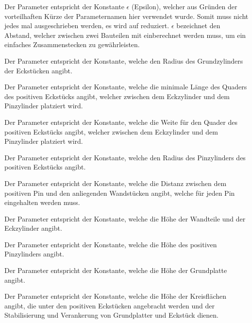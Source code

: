 \begin{description}[style=nextline]
	\item[E ($\epsilon$/Epsilon)] 
		Der Parameter  entspricht der Konstante $\epsilon$ (Epsilon), welcher aus Gründen der vorteilhaften Kürze der Parameternamen hier verwendet wurde.
		Somit muss nicht jedes mal  ausgeschrieben werden, es wird auf  reduziert.
		$\epsilon$ bezeichnet den Abstand, welcher zwischen zwei Bauteilen mit einberechnet werden muss, um ein einfaches Zusammenstecken zu gewährleisten.
	\item[CornerRadius]
		Der Parameter  entspricht der Konstante, welche den Radius des Grundzylinders der Eckstücken angibt.
	\item[PinMinLength] 
		Der Parameter  entspricht der Konstante, welche die minimale Länge des Quaders des positiven Eckstücks angibt, welcher zwischen dem Eckzylinder und dem Pinzylinder platziert wird.
	\item[PinPWidth] 
		Der Parameter  entspricht der Konstante, welche die Weite für den Quader des positiven Eckstücks angibt, welcher zwischen dem Eckzylinder und dem Pinzylinder platziert wird.
	\item[PinPRadius] 
		Der Parameter  entspricht der Konstante, welche den Radius des Pinzylinders des positiven Eckstücks angibt.
	\item[PinDistance]
		Der Parameter  entspricht der Konstante, welche die Distanz zwischen dem positiven Pin und den anliegenden Wandstücken angibt, welche für jeden Pin eingehalten werden muss.
	\item[Height]
		Der Parameter  entspricht der Konstante, welche die Höhe der Wandteile und der Eckzylinder angibt.
	\item[PinHeight]
		Der Parameter  entspricht der Konstante, welche die Höhe des positiven Pinzylinders angibt.
	\item[BasePlateHeight]
		Der Parameter  entspricht der Konstante, welche die Höhe der Grundplatte angibt.
	\item[BasePlatePinCircleHeight]
		Der Parameter  entspricht der Konstante, welche die Höhe der Kreisflächen angibt, die unter den positiven Eckstücken angebracht werden und der Stabilisierung und Verankerung von Grundplatter und Eckstück dienen.
\end{description}